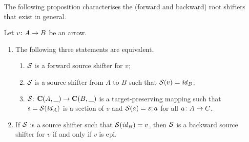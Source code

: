 The following proposition characterises the (forward and backward) root shifters that exist in general.
%
\begin{proposition}
Let $v\colon A\rightarrow B$ be an arrow.
\begin{enumerate}[topsep=\smallskipamount]
\item The following three statements are equivalent.
\begin{enumerate}[label=(\alph*),ref=\theenumi(\theenumii)]
\item\label{forward-1} $\mathcal{S}$ is a forward source shifter for $v$;
\item\label{forward-2} $\mathcal{S}$ is a source shifter from $A$ to $B$ such that $\mathcal{S}(v)=\mathit{id}_B$;
\item\label{forward-3} $\mathcal{S} \colon \mathbf{C}(A,\_) \rightarrow \mathbf{C}(B, \_)$ is a target-preserving mapping such that $s=\mathcal{S}(\mathit{id}_A)$ is a section of $v$ and $\mathcal{S}(a)=s;a$ for all $a\colon A\rightarrow C$.
\end{enumerate}
\item If $\mathcal{S}$ is a source shifter such that $\mathcal{S}(\mathit{id}_B)=v$, then $\mathcal{S}$ is a backward source shifter for $v$ if and only if $v$ is epi.
\end{enumerate}
\end{proposition}
%
